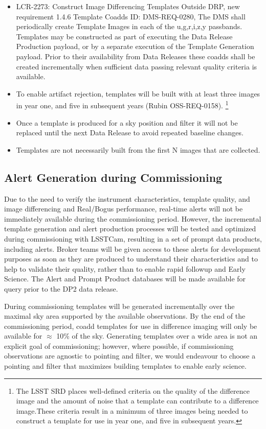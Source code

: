 \begin{itemize}
\item LCR-2273: Construct Image Differencing Templates Outside DRP, new requirement 1.4.6 Template Coadds ID: DMS-REQ-0280, The DMS shall periodically create Template Images in each of the u,g,r,i,z,y passbands. Templates may be constructed as part of executing the Data Release Production payload, or by a separate execution of the Template Generation payload. Prior to their availability from Data Releases these coadds shall be created incrementally when sufficient data passing relevant quality criteria is available.
\item To enable artifact rejection, templates will be built with at least three images in year one, and five in subsequent years (Rubin OSS-REQ-0158). \footnote{The LSST SRD places well-defined criteria on the quality of the difference image and the amount of noise that a template can contribute to a difference image.These criteria result in a minimum of three images being needed to construct a template for use in year one, and five in subsequent years.}
\item Once a template is produced for a sky position and filter it will not be replaced until the next Data Release to avoid repeated baseline changes.
\item Templates are not necessarily built from the first N images that are collected.
\end{itemize}


\subsection{Alert Generation during Commissioning}

Due to the need to verify the instrument characteristics, template quality, and image differencing and Real/Bogus performance, real-time alerts will not be immediately available during the commissioning period.
However, the incremental template generation and alert production processes will be tested and optimized during commissioning with LSSTCam, resulting in a set of prompt data products, including alerts.
Broker teams will be given access to these alerts for development purposes as soon as they are produced to understand their characteristics and to help to validate their quality, rather than to enable rapid followup and Early Science.
The Alert and Prompt Product databases will be made available for query prior to the DP2 data release.

During commissioning templates will be generated incrementally over the maximal sky area supported by the available observations.
By the end of the commissioning period, coadd templates for use in difference imaging will only be available for $\approx$ 10\% of the sky.
Generating templates over a wide area is not an explicit goal of commissioning;  however, where possible, if commissioning observations are agnostic to pointing and filter, we would endeavour to choose a pointing and filter that maximizes building templates to enable early science.

